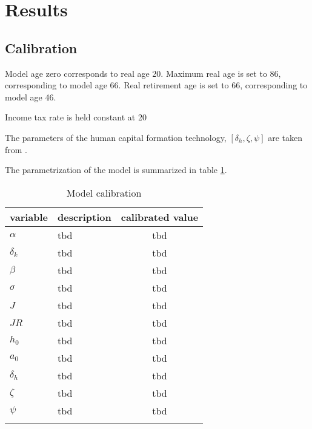\section{Results}
\label{sec:results}

\subsection{Calibration}

Model age zero corresponds to real age 20. Maximum real age is set to 86, corresponding to model age 66. Real retirement age is set to 66, corresponding to model age 46.

Income tax rate is held constant at 20%

The parameters of the human capital formation technology, $[\delta_h, \zeta, \psi]$ are taken from \cite{LudwigSchelkleVogel2012}.

The parametrization of the model is summarized in table \ref{tab:calibration}.

\begin{table}[ht]
    \caption{Model calibration}
    \label{tab:calibration}
    \centering
    \begin{tabular}{l l c}
        \hline \hline
        variable    &description        &calibrated value   \\
        \hline
        $\alpha$    &tbd                &tbd                \\
        $\delta_k$  &tbd                &tbd                \\
        $\beta$     &tbd                &tbd                \\
        $\sigma$    &tbd                &tbd                \\
        $J$         &tbd                &tbd                \\
        $JR$        &tbd                &tbd                \\
        $h_0$       &tbd                &tbd                \\
        $a_0$       &tbd                &tbd                \\
        $\delta_h$  &tbd                &tbd                \\
        $\zeta$     &tbd                &tbd                \\
        $\psi$      &tbd                &tbd                \\
        \hline \hline \\
    \end{tabular}
\end{table}


